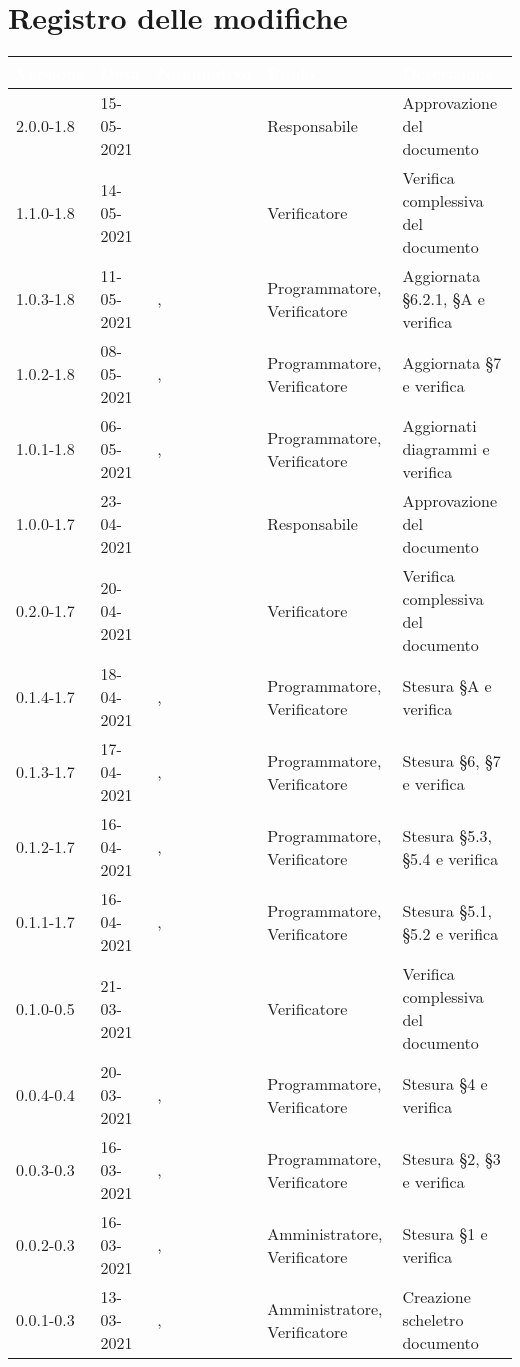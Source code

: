 \section*{Registro delle modifiche}
\setcounter{table}{-1}
{
\renewcommand{\arraystretch}{1.5}
\centering
\begin{longtable}{C{1.7cm} | C{2.2cm} | C{3.2cm} | C{3cm} | C{4.8cm}}
\textcolor{white}{\textbf{Versione}}&
\textcolor{white}{\textbf{Data}}&
\textcolor{white}{\textbf{Nominativo}}&
\textcolor{white}{\textbf{Ruolo}}&
\textcolor{white}{\textbf{Descrizione}}\\	
\endhead

2.0.0-1.8 & 15-05-2021 & \SP{} & Responsabile & Approvazione del documento \\
1.1.0-1.8 & 14-05-2021 & \SG{} & Verificatore & Verifica complessiva del documento \\
1.0.3-1.8 & 11-05-2021 & \RA{}, \BM{} & Programmatore, Verificatore & Aggiornata \S 6.2.1, \S A e verifica \\
1.0.2-1.8 & 08-05-2021 & \PA{}, \SG{} & Programmatore, Verificatore & Aggiornata \S 7 e verifica\\
1.0.1-1.8 & 06-05-2021 & \ZM{}, \BM{} & Programmatore, Verificatore & Aggiornati diagrammi e verifica \\
1.0.0-1.7 & 23-04-2021 & \RA{} & Responsabile & Approvazione del documento \\
0.2.0-1.7 & 20-04-2021 & \SP{} &  Verificatore & Verifica complessiva del documento \\
0.1.4-1.7 & 18-04-2021 & \ZM{}, \SG{} & Programmatore, Verificatore & Stesura \S A e verifica \\
0.1.3-1.7 & 17-04-2021 & \PA{}, \BM{} & Programmatore, Verificatore & Stesura \S 6, \S 7 e verifica\\
0.1.2-1.7 & 16-04-2021 & \SH{}, \SG{} & Programmatore, Verificatore & Stesura \S 5.3, \S 5.4 e verifica\\
0.1.1-1.7 & 16-04-2021 & \ZM{}, \SP{} & Programmatore, Verificatore & Stesura \S 5.1, \S 5.2 e verifica \\
0.1.0-0.5 & 21-03-2021 & \SG{} & Verificatore & Verifica complessiva del documento\\
0.0.4-0.4 & 20-03-2021 & \PA{}, \BM{} & Programmatore, Verificatore & Stesura \S 4 e verifica\\
0.0.3-0.3 & 16-03-2021 & \RA{}, \SG{} & Programmatore, Verificatore & Stesura \S 2, \S 3 e verifica \\
0.0.2-0.3 & 16-03-2021 & \SH{}, \BM{} & Amministratore, Verificatore & Stesura \S 1 e verifica\\	
0.0.1-0.3 & 13-03-2021 & \RA{}, \SP{} & Amministratore, Verificatore & Creazione scheletro documento \\
		
\end{longtable}
}